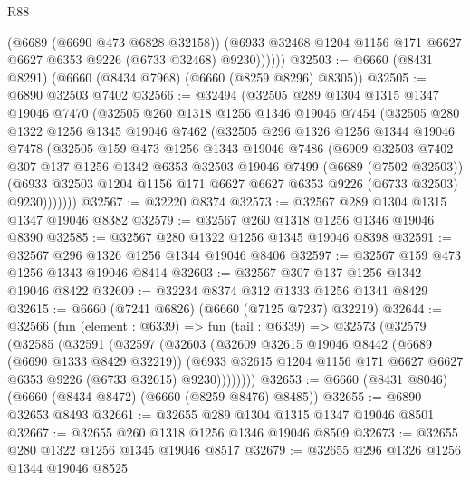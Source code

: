 \begin{lexlean}{R88}
\begin{coremodule}
              (@6689 (@6690 @473 @6828 @32158))
              (@6933 @32468 @1204 @1156 @171 @6627 @6627 @6353 @9226 (@6733 @32468) @9230))))))
@32503 := @6660 (@8431 @8291) (@6660 (@8434 @7968) (@6660 (@8259 @8296) @8305))
@32505 := @6890 @32503 @7402
@32566 := @32494
    (@32505
      @289
      @1304
      @1315
      @1347
      @19046
      @7470
      (@32505
        @260
        @1318
        @1256
        @1346
        @19046
        @7454
        (@32505
          @280
          @1322
          @1256
          @1345
          @19046
          @7462
          (@32505
            @296
            @1326
            @1256
            @1344
            @19046
            @7478
            (@32505
              @159
              @473
              @1256
              @1343
              @19046
              @7486
              (@6909
                @32503
                @7402
                @307
                @137
                @1256
                @1342
                @6353
                @32503
                @19046
                @7499
                (@6689 (@7502 @32503))
                (@6933 @32503 @1204 @1156 @171 @6627 @6627 @6353 @9226 (@6733 @32503) @9230)))))))
@32567 := @32220 @8374
@32573 := @32567 @289 @1304 @1315 @1347 @19046 @8382
@32579 := @32567 @260 @1318 @1256 @1346 @19046 @8390
@32585 := @32567 @280 @1322 @1256 @1345 @19046 @8398
@32591 := @32567 @296 @1326 @1256 @1344 @19046 @8406
@32597 := @32567 @159 @473 @1256 @1343 @19046 @8414
@32603 := @32567 @307 @137 @1256 @1342 @19046 @8422
@32609 := @32234 @8374 @312 @1333 @1256 @1341 @8429
@32615 := @6660 (@7241 @6826) (@6660 (@7125 @7237) @32219)
@32644 := @32566
    (fun (element : @6339) =>
    fun (tail : @6339) =>
    @32573
      (@32579
        (@32585
          (@32591
            (@32597
              (@32603
                (@32609
                  @32615
                  @19046
                  @8442
                  (@6689 (@6690 @1333 @8429 @32219))
                  (@6933
                    @32615
                    @1204
                    @1156
                    @171
                    @6627
                    @6627
                    @6353
                    @9226
                    (@6733 @32615)
                    @9230))))))))
@32653 := @6660 (@8431 @8046) (@6660 (@8434 @8472) (@6660 (@8259 @8476) @8485))
@32655 := @6890 @32653 @8493
@32661 := @32655 @289 @1304 @1315 @1347 @19046 @8501
@32667 := @32655 @260 @1318 @1256 @1346 @19046 @8509
@32673 := @32655 @280 @1322 @1256 @1345 @19046 @8517
@32679 := @32655 @296 @1326 @1256 @1344 @19046 @8525

\end{coremodule}
\end{lexlean}
